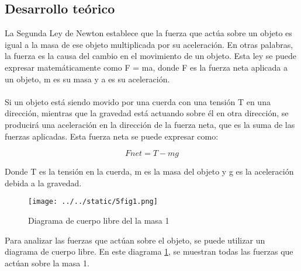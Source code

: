 \documentclass{article}
\begin{document}
\begin{multicols}{2}



\section*{Desarrollo teórico}\label{Desarrollo Teorico}                              	%
La Segunda Ley de Newton establece que la fuerza que actúa sobre un objeto es igual a la masa de ese objeto multiplicada por su aceleración. En otras palabras, la fuerza es la causa del cambio en el movimiento de un objeto. Esta ley se puede expresar matemáticamente como F = ma, donde F es la fuerza neta aplicada a un objeto, m es su masa y a es su aceleración.
\\
\\
Si un objeto está siendo movido por una cuerda con una tensión T en una dirección, mientras que la gravedad está actuando sobre él en otra dirección, se producirá una aceleración en la dirección de la fuerza neta, que es la suma de las fuerzas aplicadas. Esta fuerza neta se puede expresar como:

\begin{equation*}\label{Ec:1}
	Fnet = T - mg	
\end{equation*}

Donde T es la tensión en la cuerda, m es la masa del objeto y g es la aceleración debida a la gravedad.


\begin{figure}[H]
	\centering
	\texttt{[image: ../../static/5fig1.png]}
	\caption{Diagrama de cuerpo libre del la masa 1}
	\label{fig:1}
\end{figure}
Para analizar las fuerzas que actúan sobre el objeto, se puede utilizar un diagrama de cuerpo libre. En este diagrama \ref{fig:1}, se muestran todas las fuerzas que actúan sobre la masa 1.


\end{multicols}
\end{document}
